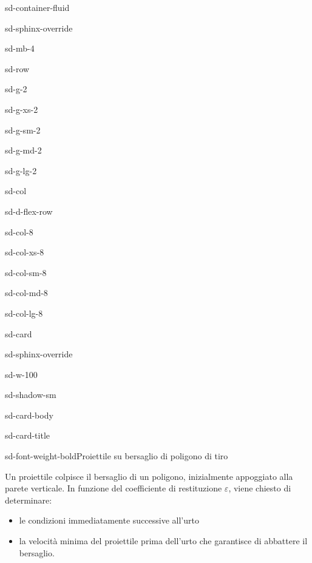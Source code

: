 \documentclass[letterpaper,10pt,italian]{jupyterBook}
\begin{document}
\begin{sphinxuseclass}{sd-container-fluid}
\begin{sphinxuseclass}{sd-sphinx-override}
\begin{sphinxuseclass}{sd-mb-4}
\begin{sphinxuseclass}{sd-row}
\begin{sphinxuseclass}{sd-g-2}
\begin{sphinxuseclass}{sd-g-xs-2}
\begin{sphinxuseclass}{sd-g-sm-2}
\begin{sphinxuseclass}{sd-g-md-2}
\begin{sphinxuseclass}{sd-g-lg-2}
\begin{sphinxuseclass}{sd-col}
\begin{sphinxuseclass}{sd-d-flex-row}
\begin{sphinxuseclass}{sd-col-8}
\begin{sphinxuseclass}{sd-col-xs-8}
\begin{sphinxuseclass}{sd-col-sm-8}
\begin{sphinxuseclass}{sd-col-md-8}
\begin{sphinxuseclass}{sd-col-lg-8}
\begin{sphinxuseclass}{sd-card}
\begin{sphinxuseclass}{sd-sphinx-override}
\begin{sphinxuseclass}{sd-w-100}
\begin{sphinxuseclass}{sd-shadow-sm}
\begin{sphinxuseclass}{sd-card-body}
\begin{sphinxuseclass}{sd-card-title}
\begin{sphinxuseclass}{sd-font-weight-bold}Proiettile su bersaglio di poligono di tiro
\end{sphinxuseclass}
\end{sphinxuseclass}
\sphinxAtStartPar
Un proiettile colpisce il bersaglio di un poligono, inizialmente appoggiato alla parete verticale. In funzione del coefficiente di restituzione \(\varepsilon\), viene chiesto di determinare:
\begin{itemize}
\item {} 
\sphinxAtStartPar
le condizioni immediatamente successive all’urto

\item {} 
\sphinxAtStartPar
la velocità minima del proiettile prima dell’urto che garantisce di abbattere il bersaglio.

\end{itemize}


\end{sphinxuseclass}
\end{sphinxuseclass}
\end{sphinxuseclass}
\end{sphinxuseclass}
\end{sphinxuseclass}
\end{sphinxuseclass}
\end{sphinxuseclass}
\end{sphinxuseclass}
\end{sphinxuseclass}
\end{sphinxuseclass}
\end{sphinxuseclass}
\end{sphinxuseclass}
\end{sphinxuseclass}
\end{sphinxuseclass}
\end{sphinxuseclass}
\end{sphinxuseclass}
\end{sphinxuseclass}
\end{sphinxuseclass}
\end{sphinxuseclass}
\end{sphinxuseclass}
\end{sphinxuseclass}
\end{document}
